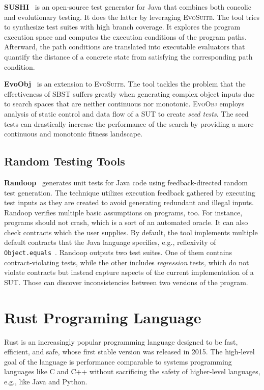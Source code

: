 \documentclass[paper=a4,%
  twoside,%
  BCOR4mm,%
  abstract=true,%
  toc=bibliography,%
  chapterprefix=true,%
  toc=bibliographynumbered,%
  open=right,%
  english,%
  pagesize=pdftex]{scrreprt}
\newcommand{\sut}{\ac{SUT}\xspace}
\begin{document}
\textbf{SUSHI}~\cite{Braione2018} is an open-source test generator for Java that combines both concolic and evolutionary testing. It does the latter by leveraging \textsc{EvoSuite}. The tool tries to synthesize test suites with high branch coverage. It explores the program execution space and computes the execution conditions of the program paths. Afterward, the path conditions are translated into executable evaluators that quantify the distance of a concrete state from satisfying the corresponding path condition.

\textbf{EvoObj}~\cite{Lin2021} is an extension to \textsc{EvoSuite}. The tool tackles the problem that the effectiveness of \ac{SBST} suffers greatly when generating complex object inputs due to search spaces that are neither continuous nor monotonic. \textsc{EvoObj} employs analysis of static control and data flow of a \sut to create \emph{seed tests}. The seed tests can drastically increase the performance of the search by providing a more continuous and monotonic fitness landscape.

\section{Random Testing Tools}
\textbf{Randoop}~\cite{Pacheco_2007} generates unit tests for Java code using feedback-directed random test generation. The technique utilizes execution feedback gathered by executing test inputs as they are created to avoid generating redundant and illegal inputs. Randoop verifies multiple basic assumptions on programs, too. For instance, programs should not crash, which is a sort of an automated oracle. It can also check  contracts which the user supplies. By default, the tool implements multiple default contracts that the Java language specifies, e.g., reflexivity of \texttt{Object.equals}~\cite{Fraser2013}. Randoop outputs two test suites. One of them contains contract-violating tests, while the other includes \emph{regression} tests, which do not violate contracts but instead capture aspects of the current implementation of a \sut. Those can discover inconsistencies between two versions of the program.


\clearpage
\chapter{Rust Programing Language}
\label{chap:rust-programming-language}
Rust is an increasingly popular programming language designed to be fast, efficient, and safe, whose first stable version was released in 2015. The high-level goal of the language is performance comparable to systems programming languages like C and C++ without sacrificing the safety of higher-level languages, e.g., like Java and Python.
\end{document}
